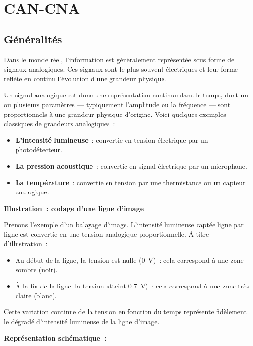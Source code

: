\section{CAN-CNA}
\subsection{Généralités}

Dans le monde réel, l'information est généralement représentée sous forme de 
signaux analogiques. Ces signaux sont le plus souvent électriques et leur forme 
reflète en continu l'évolution d'une grandeur physique.\par

Un signal analogique est donc une représentation continue dans le temps, dont un 
ou plusieurs paramètres — typiquement l’amplitude ou la fréquence — sont 
proportionnels à une grandeur physique d’origine. Voici quelques exemples 
classiques de grandeurs analogiques~:

\begin{itemize}
    \item \textbf{L’intensité lumineuse}~: convertie en tension électrique par un photodétecteur.
    \item \textbf{La pression acoustique}~: convertie en signal électrique par un microphone.
    \item \textbf{La température}~: convertie en tension par une thermistance ou un capteur analogique.
\end{itemize}

\textbf{\sffamily Illustration~: codage d’une ligne d’image}

Prenons l’exemple d’un balayage d’image. L’intensité lumineuse captée ligne par 
ligne est convertie en une tension analogique proportionnelle. À titre 
d’illustration~:

\begin{itemize}
    \item Au début de la ligne, la tension est nulle (\SI{0}{\volt})~: cela correspond à une zone sombre (noir).
    \item À la fin de la ligne, la tension atteint \SI{0.7}{\volt})~: cela correspond à une zone très claire (blanc).
\end{itemize}

Cette variation continue de la tension en fonction du temps représente 
fidèlement le dégradé d’intensité lumineuse de la ligne d’image.

\vspace{0.5cm}
\textbf{\sffamily Représentation schématique~:}

